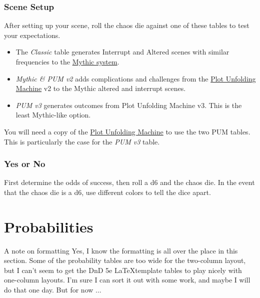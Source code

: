

\subsection{Scene Setup}
After setting up your scene, roll the chaos die against one of these tables to
test your expectations.
\begin{itemize}
\item The \emph{Classic} table generates Interrupt and Altered scenes with similar
frequencies to the \href{https://www.wordmillgames.com/mythic-gme.html}{Mythic
system}.
\item \emph{Mythic \& PUM v2} adds complications and challenges from the
\href{https://jeansenvaars.itch.io/plot-unfolding-machine}{Plot Unfolding
Machine} v2 to the Mythic altered and interrupt scenes.
\item \emph{PUM v3} generates outcomes from Plot Unfolding Machine v3. This is
the least Mythic-like option.
\end{itemize}
\begin{DndComment}{}
You will need a copy of the
\href{https://jeansenvaars.itch.io/plot-unfolding-machine}{Plot Unfolding
Machine} to use the two PUM tables. This is particularly the case for the
\emph{PUM v3} table.
\end{DndComment}





\subsection{Yes or No}
First determine the odds of success, then roll a d6 and the chaos die. In the
event that the chaos die is a d6, use different colors to tell the dice apart.


\appendix
\onecolumn
\chapter{Probabilities}
\begin{DndComment}{A note on formatting}
Yes, I know the formatting is all over the place in this section. Some of the
probability tables are too wide for the two-column layout, but I can't seem to
get the DnD 5e \LaTeX template tables to play nicely with one-column layouts.
I'm sure I can sort it out with some work, and maybe I will do that one day. But
for now ...
\end{DndComment}

